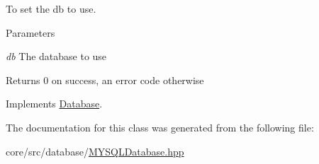 To set the db to use. 


\begin{DoxyParams}{Parameters}
\item[{\em db}]The database to use \end{DoxyParams}
\begin{DoxyReturn}{Returns}
0 on success, an error code otherwise 
\end{DoxyReturn}


Implements \hyperlink{classDatabase_aeba15395d2a36faf73dcb995695b9204}{Database}.



The documentation for this class was generated from the following file:\begin{DoxyCompactItemize}
\item 
core/src/database/\hyperlink{MYSQLDatabase_8hpp}{MYSQLDatabase.hpp}\end{DoxyCompactItemize}
